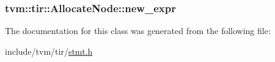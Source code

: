 \subsubsection[{\texorpdfstring{new\+\_\+expr}{new_expr}}]{ tvm\+::tir\+::\+Allocate\+Node\+::new\+\_\+expr}\hypertarget{classtvm_1_1tir_1_1AllocateNode_a52b31635e23aeb6e18e83aa3cc9f8d00}{}\label{classtvm_1_1tir_1_1AllocateNode_a52b31635e23aeb6e18e83aa3cc9f8d00}


The documentation for this class was generated from the following file\+:\begin{DoxyCompactItemize}
\item 
include/tvm/tir/\hyperlink{stmt_8h}{stmt.\+h}\end{DoxyCompactItemize}
